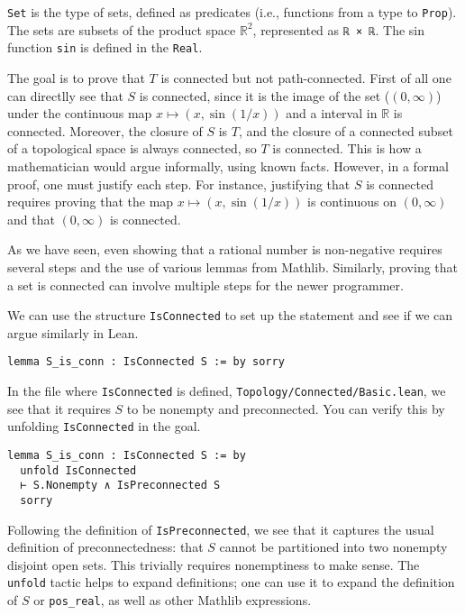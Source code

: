 \lstinline[language=lean]|Set| is the type of sets, defined as predicates
(i.e., functions from a type to \lstinline[language=lean]|Prop|).
The sets are subsets of the product space $\mathbb{R}^2$,
represented as \lstinline[language=lean]|ℝ × ℝ|.
The sin function \lstinline[language=lean]|sin| is defined in the
\lstinline[language=lean]|Real|.

The goal is to prove that $T$ is connected but not path-connected.
First of all one can directlly see that  $S$ is connected, since it is the
image of the set ($(0, \infty)$) under the continuous map
$x \mapsto (x, \sin(1/x))$ and a interval in $\mathbb{R}$ is connected.
Moreover, the closure of $S$ is $T$, and the closure of a connected subset of a topological space
is always connected,
so $T$ is connected.
This is how a mathematician would argue informally, using known facts.
However, in a formal proof, one must justify each step.
For instance, justifying that $S$ is connected
requires proving that the map
$x \mapsto (x, \sin(1/x))$ is continuous on $(0, \infty)$
and that $(0, \infty)$ is connected.

As we have seen, even showing that a rational number is non-negative
requires several steps and the use of various lemmas from Mathlib.
Similarly, proving that a set is connected can involve multiple steps
for the
newer programmer.


We can use the structure \lstinline[language=lean]|IsConnected|
to set up the statement and see if we can argue similarly in Lean.
\begin{lstlisting}[language=lean]
lemma S_is_conn : IsConnected S := by sorry
\end{lstlisting}
In the file where \lstinline[language=lean]|IsConnected| is defined,
\texttt{Topology/Connected/Basic.lean}, we see that it requires $S$ to be nonempty and preconnected.
You can verify this by unfolding \lstinline[language=lean]|IsConnected| in the goal.
\begin{lstlisting}[language=lean]
lemma S_is_conn : IsConnected S := by
  unfold IsConnected 
  ⊢ S.Nonempty ∧ IsPreconnected S
  sorry
\end{lstlisting}
Following the definition of \lstinline[language=lean]|IsPreconnected|, we see that it captures
the usual definition of preconnectedness: that $S$ cannot be
partitioned into two nonempty disjoint open sets. This trivially requires
nonemptiness to make sense.
The \lstinline[language=lean]|unfold| tactic helps to expand definitions; one can use it to expand the definition of $S$ or
\lstinline[language=lean]|pos_real|, as well as other Mathlib expressions.

